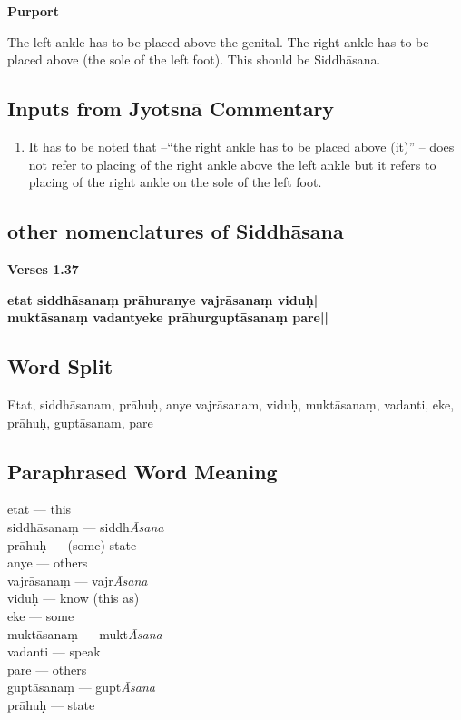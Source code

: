 \textbf{Purport}

The left ankle has to be placed above the genital. The right ankle has to be placed above (the sole of the left foot). This should be Siddhāsana.

\subsection*{Inputs from Jyotsnā Commentary}


\begin{enumerate}
\item It has to be noted that –“the right ankle has to be placed above (it)” – does not refer to placing of the right ankle above the left ankle but it refers to placing of the right ankle on the sole of the left foot. 
\end{enumerate}

\subsection*{other nomenclatures of Siddhāsana}

\noindent \textbf{Verses 1.37}

\begin{shloka}
\textbf{etat siddhāsanaṃ prāhuranye vajrāsanaṃ viduḥ|}\\
\textbf{muktāsanaṃ vadantyeke prāhurguptāsanaṃ pare||}
\end{shloka}
\vspace{-10pt}

\subsection*{Word Split}
\vspace{-10pt}

Etat, siddhāsanam, prāhuḥ, anye vajrāsanam, viduḥ, muktāsanaṃ, vadanti, eke, prāhuḥ, guptāsanam, pare
\vspace{-10pt}

\subsection*{Paraphrased Word Meaning}
\vspace{-10pt}

\begin{multicols}{2}
\itemsep=0pt
etat --- this   \\
siddhāsanaṃ --- siddh\textit{Āsana}   \\
prāhuḥ --- (some) state \\
anye --- others   \\
vajrāsanaṃ --- vajr\textit{Āsana}  \\
viduḥ --- know (this as) \\
eke --- some \\
muktāsanaṃ --- mukt\textit{Āsana}   \\
vadanti --- speak \\
pare --- others \\
guptāsanaṃ ---  gupt\textit{Āsana}  \\
prāhuḥ --- state  
\end{multicols}
\vspace{-10pt}


